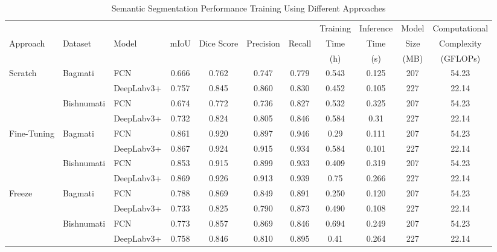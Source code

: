 \documentclass{ieeeaccess}
\begin{document}
\begin{table}[]
\centering
\caption{Semantic Segmentation Performance Training Using Different Approaches}
\begin{tabular}{lllcccccccc}
\hline
 &  &  &  &   &  &  & Training  & Inference & Model & Computational\\ 
\multicolumn{1}{l}{Approach} & Dataset & Model & mIoU &  Dice Score   & Precision & Recall & Time & Time & Size & Complexity\\
 &  &  &  &&  &  & (h) & (s) & (MB) & (GFLOPs) \\
\hline
\multirow{4}{*}{Scratch} & \multirow{2}{*}{Bagmati} & \multicolumn{1}{l}{FCN} & 0.666 & 0.762 & 0.747  &  0.779 & 0.543 & 0.125  & 207 & 54.23\\
& & DeepLabv3+ &  0.757 &  0.845& 0.860 &  0.830 & 0.452 & 0.105 &227 & 22.14 \\ 
\cline{2-11}
& \multirow{2}{*}{Bishnumati} & \multicolumn{1}{l}{FCN} & 0.674 & 0.772 &0.736  & 0.827 & 0.532 & 0.325 &207 & 54.23  \\
& & DeepLabv3+ & 0.732 & 0.824 & 0.805  &  0.846 & 0.584 &0.31 &227 & 22.14 \\ \hline
\multirow{4}{*}{Fine-Tuning}        & \multirow{2}{*}{Bagmati}    & \multicolumn{1}{l}{FCN}  & 0.861 & 0.920 & 0.897 & 0.946 & 0.29 & 0.111  &207 &54.23 \\
& & DeepLabv3+ & 0.867 & 0.924 & 0.915 & 0.934 & 0.584 & 0.101 &227 & 22.14  \\
\cline{2-11}
& \multirow{2}{*}{Bishnumati} & \multicolumn{1}{l}{FCN} &  0.853 & 0.915 & 0.899 &  0.933 & 0.409& 0.319 &207 &54.23\\
& & DeepLabv3+ &  0.869 & 0.926 & 0.913 & 0.939 & 0.75 & 0.266 &227 & 22.14\\ \hline
\multirow{4}{*}{Freeze} & \multirow{2}{*}{Bagmati}    & \multicolumn{1}{l}{FCN} & 0.788 & 0.869  & 0.849 & 0.891 &0.250 & 0.120  &207 &54.23 \\
& & DeepLabv3+ &  0.733 & 0.825  & 0.790  &  0.873 & 0.490 & 0.108 &227 & 22.14\\
\cline{2-11}
& \multirow{2}{*}{Bishnumati} & \multicolumn{1}{l}{FCN} & 0.773 & 0.857 & 0.869 & 0.846 &  0.694 & 0.249 &207 &54.23\\
& & DeepLabv3+ &  0.758& 0.846 & 0.810 & 0.895 & 0.41 & 0.264&227 & 22.14 \\ \hline
\end{tabular}
\label{table:IS}
\end{table}
\end{document}
